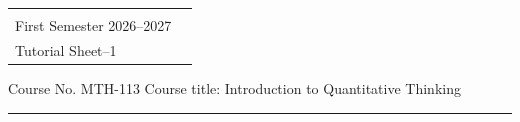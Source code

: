 \documentclass[a4paper,leqno,12pt]{amsart}
\begin{document}
\hspace*{1.9cm}%
\begin{tabular}{@{}p{}p{}@{}}
 {\raggedright
   \begin{center} 
   \textbf{AZIM PREMJI UNIVERSITY, BHOPAL}\\
   First Semester 2026--2027 \\
   Tutorial Sheet--1
   \end{center}
  } %
\end{tabular}


\noindent Course No. MTH-113 \hfill  Course title: Introduction to Quantitative Thinking
\vspace{.3cm}
\hrule 
\vspace{.3cm}
\end{document}

